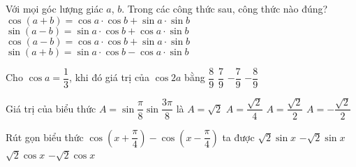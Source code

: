 \begin{ex}%
Với mọi góc lượng giác $a$, $b$. Trong các công thức sau, công thức nào đúng?
	\choice
	{$\cos \left( a+b \right) = \cos a \cdot \cos b + \sin a \cdot \sin b$}
	{$\sin \left( a-b \right) = \sin a \cdot \cos b + \cos a \cdot \sin b$}
	{\True $\cos \left( a-b \right) = \cos a \cdot \cos b + \sin a \cdot \sin b$}
	{$\sin \left( a+b \right) = \sin a \cdot \cos b - \cos a \cdot \sin b$}
\end{ex}
\begin{ex}%
	Cho $\cos a =\dfrac{1}{3}$, khi đó giá trị của $\cos 2a$ bằng
	\choice
	{$\dfrac{8}{9}$}
	{$\dfrac{7}{9}$}
	{\True $-\dfrac{7}{9}$}
	{$-\dfrac{8}{9}$}
\end{ex}
\begin{ex}%
	Giá trị của biểu thức $A=\sin \dfrac{\pi}{8} \sin \dfrac{3\pi}{8}$ là
	\choice
	{$A=\sqrt{2}$}
	{\True $A=\dfrac{\sqrt{2}}{4}$}
	{$A=\dfrac{\sqrt{2}}{2}$}
	{$A=-\dfrac{\sqrt{2}}{2}$}
\end{ex}
\begin{ex}%
Rút gọn biểu thức $\cos \left( x+\dfrac{\pi}{4} \right) - \cos \left( x-\dfrac{\pi}{4} \right)$ ta được
	\choice
	{$\sqrt{2}\sin x$}
	{\True $-\sqrt{2}\sin x$}
	{$\sqrt{2}\cos x$}
	{$-\sqrt{2}\cos x$}
\end{ex}
